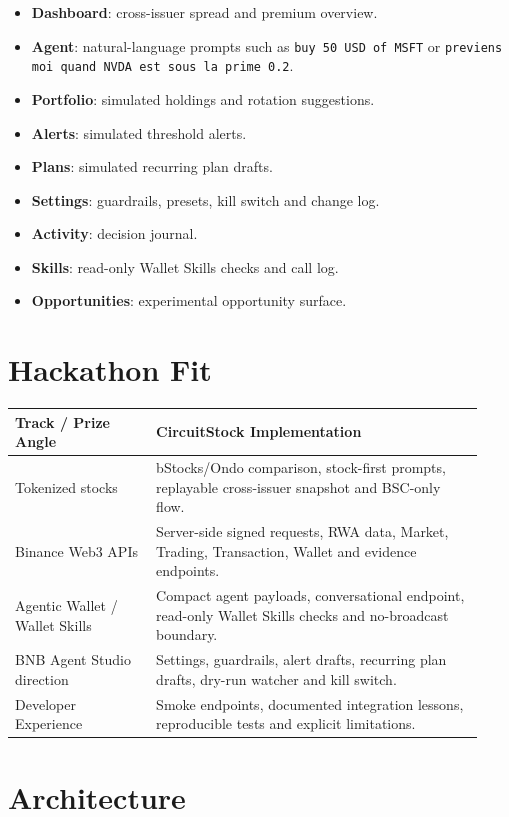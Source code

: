 \documentclass[11pt,a4paper]{article}
\begin{document}
\begin{itemize}
  \item \textbf{Dashboard}: cross-issuer spread and premium overview.
  \item \textbf{Agent}: natural-language prompts such as \texttt{buy 50 USD of MSFT} or \texttt{previens moi quand NVDA est sous la prime 0.2}.
  \item \textbf{Portfolio}: simulated holdings and rotation suggestions.
  \item \textbf{Alerts}: simulated threshold alerts.
  \item \textbf{Plans}: simulated recurring plan drafts.
  \item \textbf{Settings}: guardrails, presets, kill switch and change log.
  \item \textbf{Activity}: decision journal.
  \item \textbf{Skills}: read-only Wallet Skills checks and call log.
  \item \textbf{Opportunities}: experimental opportunity surface.
\end{itemize}

\section{Hackathon Fit}

\begin{longtable}{p{0.28\linewidth}p{0.65\linewidth}}
\textbf{Track / Prize Angle} & \textbf{CircuitStock Implementation} \\
\hline
Tokenized stocks & bStocks/Ondo comparison, stock-first prompts, replayable cross-issuer snapshot and BSC-only flow. \\
Binance Web3 APIs & Server-side signed requests, RWA data, Market, Trading, Transaction, Wallet and evidence endpoints. \\
Agentic Wallet / Wallet Skills & Compact agent payloads, conversational endpoint, read-only Wallet Skills checks and no-broadcast boundary. \\
BNB Agent Studio direction & Settings, guardrails, alert drafts, recurring plan drafts, dry-run watcher and kill switch. \\
Developer Experience & Smoke endpoints, documented integration lessons, reproducible tests and explicit limitations. \\
\end{longtable}

\section{Architecture}
\end{document}
